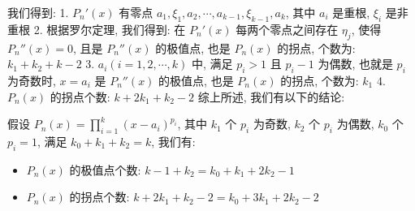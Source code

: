 \begin{anymark}[证明]
	我们得到:
	1. $P_{n}'(x)$ 有零点 $a_{1},\xi_{1},a_{2},\cdots,a_{k-1},\xi_{k-1},a_{k}$, 其中 $a_{i}$ 是重根, $\xi_{i}$ 是非重根
	2. 根据罗尔定理, 我们得到: 在 $P_{n}'(x)$ 每两个零点之间存在 $\eta_{j}$, 使得 $P_{n}''(x) = 0$, 且是 $P_{n}''(x)$ 的极值点, 也是 $P_{n}(x)$ 的拐点, 个数为: $k_{1}+k_{2}+k-2$
	3. $a_{i}(i=1,2,\cdots,k)$ 中, 满足 $p_{i} > 1$ 且 $p_{i}-1$ 为偶数, 也就是 $p_{i}$ 为奇数时, $x = a_{i}$ 是 $P_{n}''(x)$ 的极值点, 也是 $P_{n}(x)$ 的拐点, 个数为: $k_{1}$
	4. $P_{n}(x)$ 的拐点个数: $k+2k_{1}+k_{2}-2$
	综上所述, 我们有以下的结论:
	\begin{corollary}[极值点和拐点个数]
		假设 $P_{n}(x)=\prod\limits_{i=1}^{k}(x-a_{i})^{p_{i}}$, 其中 $k_{1}$ 个 $p_{i}$ 为奇数, $k_{2}$ 个 $p_{i}$ 为偶数, $k_{0}$ 个 $p_{i}=1$, 满足 $k_{0}+k_{1}+k_{2} = k$, 我们有:
		\begin{itemize}
			\item $P_{n}(x)$ 的极值点个数: $k-1+k_{2} = k_{0}+k_{1}+2k_{2}-1$
			\item $P_{n}(x)$ 的拐点个数: $k+2k_{1}+k_{2}-2 = k_{0}+3k_{1}+2k_{2}-2$
		\end{itemize}
	\end{corollary}
\end{anymark}



